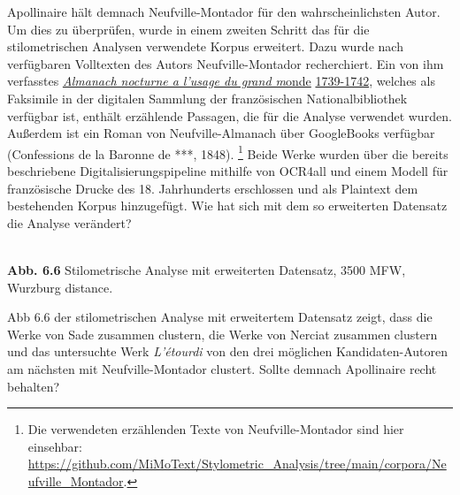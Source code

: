 \documentclass[
  letterpaper,
  DIV=11,
  numbers=noendperiod]{scrreprt}
\makeatletter
\newcommand*\pandocbounded[1]{%
  \sbox\pandoc@box{#1}%
  \Gscale@div\@tempa{\textheight}{\dimexpr\ht\pandoc@box+\dp\pandoc@box\relax}%
  \Gscale@div\@tempb{\linewidth}{\wd\pandoc@box}%
  \ifdim\@tempb\p@<\@tempa\p@\let\@tempa\@tempb\fi%
  \ifdim\@tempa\p@<\p@\scalebox{\@tempa}{\usebox\pandoc@box}%
  \else\usebox{\pandoc@box}%
  \fi%
}
\makeatother
\begin{document}
Apollinaire hält demnach Neufville-Montador für den wahrscheinlichsten
Autor. Um dies zu überprüfen, wurde in einem zweiten Schritt das für die
stilometrischen Analysen verwendete Korpus erweitert. Dazu wurde nach
verfügbaren Volltexten des Autors Neufville-Montador recherchiert. Ein
von ihm verfasstes
\href{https://gallica.bnf.fr/services/engine/search/sru?operation=searchRetrieve&version=1.2&collapsing=disabled&query=\%28gallica\%20all\%20\%22neufville-montador\%22\%29\%20and\%20arkPress\%20all\%20\%22cb46635638h_date\%22&rk=64378;0}{\emph{Almanach
nocturne a l'usage du grand m}onde}
\href{https://gallica.bnf.fr/services/engine/search/sru?operation=searchRetrieve&version=1.2&collapsing=disabled&query=\%28gallica\%20all\%20\%22neufville-montador\%22\%29\%20and\%20arkPress\%20all\%20\%22cb46635638h_date\%22&rk=64378;0}{1739-1742},
welches als Faksimile in der digitalen Sammlung der französischen
Nationalbibliothek verfügbar ist, enthält erzählende Passagen, die für
die Analyse verwendet wurden. Außerdem ist ein Roman von
Neufville-Almanach über GoogleBooks verfügbar (Confessions de la Baronne
de ***, 1848). \footnote{Die verwendeten erzählenden Texte von
  Neufville-Montador sind hier einsehbar:
  \url{https://github.com/MiMoText/Stylometric_Analysis/tree/main/corpora/Neufville_Montador}.}
Beide Werke wurden über die bereits beschriebene
Digitalisierungspipeline mithilfe von OCR4all und einem Modell für
französische Drucke des 18. Jahrhunderts erschlossen und als Plaintext
dem bestehenden Korpus hinzugefügt. Wie hat sich mit dem so erweiterten
Datensatz die Analyse verändert?

\pandocbounded{\texttt{[image: index\_files/mediabag/AAAAABJRU5ErkJggg==.png]}}\\
\textbf{Abb. 6.6} Stilometrische Analyse mit erweiterten Datensatz, 3500
MFW, Wurzburg distance.

Abb 6.6 der stilometrischen Analyse mit erweitertem Datensatz zeigt,
dass die Werke von Sade zusammen clustern, die Werke von Nerciat
zusammen clustern und das untersuchte Werk \emph{L'étourdi} von den drei
möglichen Kandidaten-Autoren am nächsten mit Neufville-Montador
clustert. Sollte demnach Apollinaire recht behalten?
\end{document}
